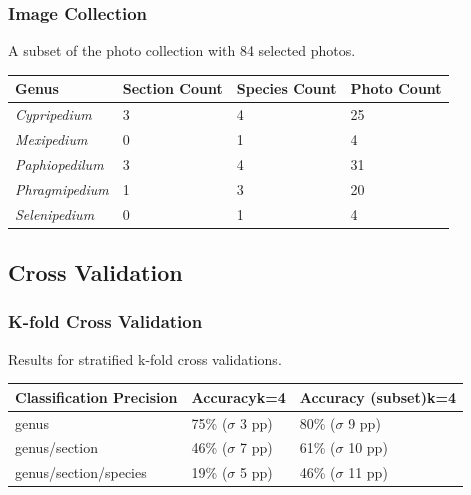 \documentclass[]{beamer}
\begin{document}
    \begin{frame}[plain]
        \frametitle{Image Collection}

        A subset of the photo collection with 84 selected photos.

        \begin{table}[h]\scriptsize
            \begin{center}
            \begin{tabular}{llll}
            \toprule
            \textbf{Genus} & \textbf{Section Count} & \textbf{Species Count} & \textbf{Photo Count} \\
            \midrule
            \textit{Cypripedium} & 3 & 4 & 25 \\
            \textit{Mexipedium} & 0 & 1 & 4 \\
            \textit{Paphiopedilum} & 3 & 4 & 31 \\
            \textit{Phragmipedium} & 1 & 3 & 20 \\
            \textit{Selenipedium} & 0 & 1 & 4 \\
            \bottomrule
            \end{tabular}
            \end{center}
        \end{table}
    \end{frame}

    \subsection{Cross Validation}

    \begin{frame}
        \frametitle{K-fold Cross Validation}

        Results for stratified k-fold cross validations.

        \begin{table}[h]\scriptsize
            \begin{center}
            \begin{tabular}{lp{3cm}p{3cm}}
            \toprule
            \textbf{Classification Precision} & \textbf{Accuracy{\newline}k=4} & \textbf{Accuracy (subset){\newline}k=4} \\
            \midrule
            genus                   & 75\% ({$\sigma$} 3 pp)    & 80\% ({$\sigma$} 9 pp) \\
            genus/section           & 46\% ({$\sigma$} 7 pp)    & 61\% ({$\sigma$} 10 pp) \\
            genus/section/species   & 19\% ({$\sigma$} 5 pp)    & 46\% ({$\sigma$} 11 pp) \\
            \bottomrule
            \end{tabular}
            \end{center}
        \end{table}
    \end{frame}
\end{document}
